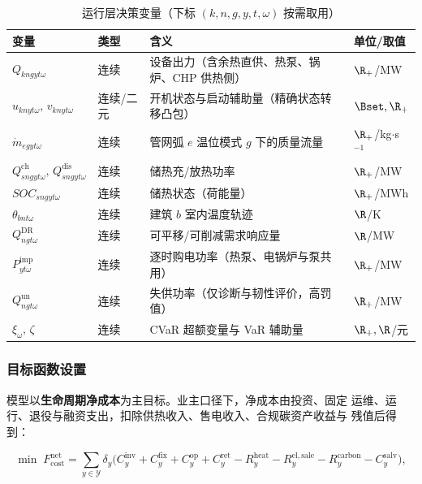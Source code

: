 \begin{table}[H]
  \centering
  \caption{运行层决策变量（下标 $(k,n,g,y,t,\omega)$ 按需取用）}
  \label{tab:op-vars}
  \small
  \begin{tabularx}{\textwidth}{llXl}
    \toprule
    变量 & 类型 & 含义 & 单位/取值 \\
    \midrule
    $Q_{kngyt\omega}$ & 连续 & 设备出力（含余热直供、热泵、锅炉、CHP 供热侧） & $\R_+$/MW \\
    $u_{knyt\omega},\,v_{knyt\omega}$ & 连续/二元 & 开机状态与启动辅助量（精确状态转移凸包） & $\Bset,\R_+$ \\
    $\dot m_{egyt\omega}$ & 连续 & 管网弧 $e$ 温位模式 $g$ 下的质量流量 & $\R_+$/kg$\cdot$s$^{-1}$ \\
    $Q^{\mathrm{ch}}_{sngyt\omega},\,Q^{\mathrm{dis}}_{sngyt\omega}$ & 连续 & 储热充/放热功率 & $\R_+$/MW \\
    $SOC_{sngyt\omega}$ & 连续 & 储热状态（荷能量） & $\R_+$/MWh \\
    $\theta_{bnt\omega}$ & 连续 & 建筑 $b$ 室内温度轨迹 & $\R$/K \\
    $Q^{\mathrm{DR}}_{ngt\omega}$ & 连续 & 可平移/可削减需求响应量 & $\R$/MW \\
    $P^{\mathrm{imp}}_{y t\omega}$ & 连续 & 逐时购电功率（热泵、电锅炉与泵共用） & $\R_+$/MW \\
    $Q^{\mathrm{un}}_{ngt\omega}$ & 连续 & 失供功率（仅诊断与韧性评价，高罚值） & $\R_+$/MW \\
    $\xi_\omega,\,\zeta$ & 连续 & CVaR 超额变量与 VaR 辅助量 & $\R_+,\R$/元 \\
    \bottomrule
  \end{tabularx}
\end{table}

\subsubsection{目标函数设置}

模型以\textbf{生命周期净成本}为主目标。业主口径下，净成本由投资、固定
运维、运行、退役与融资支出，扣除供热收入、售电收入、合规碳资产收益与
残值后得到：

\begin{equation}
\label{eq:obj}
\min\; F_{\mathrm{cost}}^{\mathrm{net}}
=\sum_{y\in\mathcal Y}\delta_y\Big(
C_y^{\mathrm{inv}}+C_y^{\mathrm{fix}}+C_y^{\mathrm{op}}
+C_y^{\mathrm{ret}}-R_y^{\mathrm{heat}}-R_y^{\mathrm{el,sale}}
-R_y^{\mathrm{carbon}}-C_y^{\mathrm{salv}}\Big),
\end{equation}

